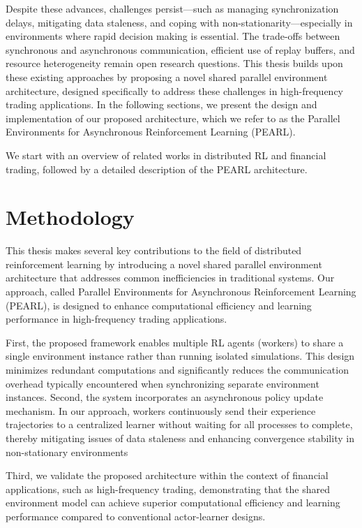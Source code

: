 Despite these advances, challenges persist—such as managing synchronization delays, mitigating data staleness,
and coping with non-stationarity—especially in environments where rapid decision making is essential.
The trade-offs between synchronous and asynchronous communication, efficient use of replay buffers, and resource heterogeneity remain open research questions.
This thesis builds upon these existing approaches by proposing a novel shared parallel environment architecture,
designed specifically to address these challenges in high-frequency trading applications.
In the following sections, we present the design and implementation of our proposed architecture,
which we refer to as the Parallel Environments for Asynchronous Reinforcement Learning (PEARL).

We start with an overview of related works in distributed RL and financial trading, followed by a detailed description of the PEARL architecture.



\section{Methodology}
\label{sec:methodology}

This thesis makes several key contributions to the field of distributed reinforcement learning by introducing a novel shared
parallel environment architecture that addresses common inefficiencies in traditional systems.
Our approach, called Parallel Environments for Asynchronous Reinforcement Learning (PEARL),
is designed to enhance computational efficiency and learning performance in high-frequency trading applications.

First, the proposed framework enables multiple RL agents (workers) to share a single environment instance rather than running isolated simulations.
This design minimizes redundant computations and significantly reduces the communication overhead typically
encountered when synchronizing  separate environment instances.
Second, the system incorporates an asynchronous policy update mechanism.
In our approach, workers continuously send their experience trajectories to a centralized learner without waiting for all processes to complete,
thereby mitigating issues of data staleness and enhancing convergence stability in non-stationary environments

Third, we validate the proposed architecture within the context of financial applications,
such as high-frequency trading, demonstrating that the shared environment
model can achieve superior computational efficiency and learning performance compared to conventional actor-learner designs.

